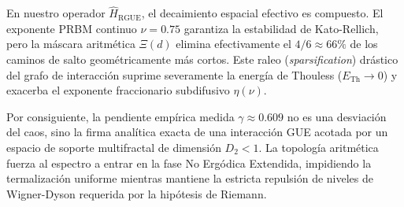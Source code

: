 \documentclass[aps,prl,preprint,superscriptaddress,floatfix]{revtex4-2}
\begin{document}
En nuestro operador $\hat{H}_{\text{RGUE}}$, el decaimiento espacial efectivo es compuesto. El exponente PRBM continuo $\nu=0.75$ garantiza la estabilidad de Kato-Rellich, pero la máscara aritmética $\Xi(d)$ elimina efectivamente el $4/6 \approx 66\%$ de los caminos de salto geométricamente más cortos. Este raleo (\textit{sparsification}) drástico del grafo de interacción suprime severamente la energía de Thouless ($E_{\text{Th}} \to 0$) y exacerba el exponente fraccionario subdifusivo $\eta(\nu)$.

Por consiguiente, la pendiente empírica medida $\gamma \approx 0.609$ no es una desviación del caos, sino la firma analítica exacta de una interacción GUE acotada por un espacio de soporte multifractal de dimensión $D_2 < 1$. La topología aritmética fuerza al espectro a entrar en la fase No Ergódica Extendida, impidiendo la termalización uniforme mientras mantiene la estricta repulsión de niveles de Wigner-Dyson requerida por la hipótesis de Riemann.



\end{document}
